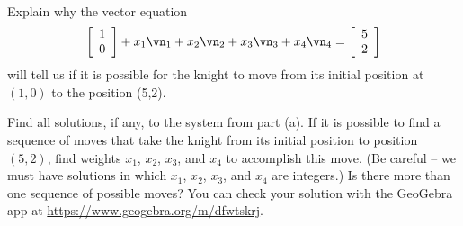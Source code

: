 \begin{pactivity} \label{act:knight_1} ~
\ba
\item Explain why the vector equation 
\[\left[ \begin{array}{c} 1\\0 \end{array} \right] + x_1 \vn_1 + x_2 \vn_2 + x_3 \vn_3 + x_4 \vn_4 = \left[ \begin{array}{c} 5\\2 \end{array} \right]\]
will tell us if it is possible for the knight to move from its initial position at $(1,0)$ to the position (5,2). 

\begin{comment}

A sequence of moves is given by the linear combination $x_1 \vn_1 + x_2 \vn_2 + x_3 \vn_3 + x_4 \vn_4$. Since the knight starts at $(1,0)$, the final position of the knight is 
\[\left[ \begin{array}{c} 1\\0 \end{array} \right] + x_1 \vn_1 + x_2 \vn_2 + x_3 \vn_3 + x_4 \vn_4.\]
So we need to solve the system
\[\left[ \begin{array}{c} 1\\0 \end{array} \right] + x_1 \vn_1 + x_2 \vn_2 + x_3 \vn_3 + x_4 \vn_4 = \left[ \begin{array}{c} 5\\2 \end{array} \right].\]

\end{comment}

	\item Find all solutions, if any, to the system from part (a). If it is possible to find a sequence of moves that take the knight from its initial position to position $(5,2)$, find weights $x_1$, $x_2$, $x_3$, and $x_4$ to accomplish this move. (Be careful -- we must have solutions in which $x_1$, $x_2$, $x_3$, and $x_4$ are integers.) Is there more than one sequence of possible moves? You can check your solution with the GeoGebra app at \url{https://www.geogebra.org/m/dfwtskrj}.

\begin{comment}


\end{comment}
\end{pactivity}
